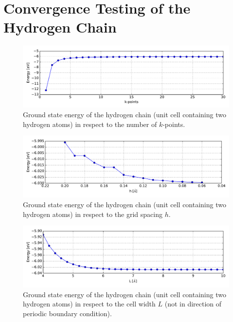\section{Convergence Testing of the Hydrogen Chain}

\begin{figure}[!h]
	\centering
	\includegraphics[width = 13cm]{Images/Hydrogen/convergence/kpts-energy}
	\caption{Ground state energy of the hydrogen chain (unit cell containing two hydrogen atoms) in respect to the number of $k$-points.}
	\label{}
\end{figure}
\begin{figure}[!h]
	\centering
	\includegraphics[width = 13cm]{Images/Hydrogen/convergence/gridspacing-energy}
	\caption{Ground state energy of the hydrogen chain (unit cell containing two hydrogen atoms) in respect to the grid spacing $h$.}
	\label{}
\end{figure}
\begin{figure}[!h]
	\centering
	\includegraphics[width = 13cm]{Images/Hydrogen/convergence/unit_cell_width}
	\caption{Ground state energy of the hydrogen chain (unit cell containing two hydrogen atoms) in respect to the cell width $L$ (not in direction of periodic boundary condition).}
	\label{}
\end{figure}

